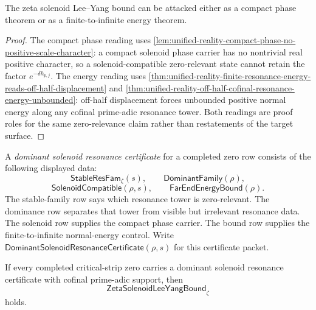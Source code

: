 \begin{corollary}
\label{cor:unified-reality-two-noncircular-readings-same-target}
The zeta solenoid Lee--Yang bound can be attacked either as a compact
phase theorem or as a finite-to-infinite energy theorem.
\end{corollary}

\begin{proof}
The compact phase reading uses
\autoref{lem:unified-reality-compact-phase-no-positive-scale-character}:
a compact solenoid phase carrier has no nontrivial real positive
character, so a solenoid-compatible zero-relevant state cannot retain the
factor $e^{-\delta h_{p,j}}$.  The energy reading uses
\autoref{thm:unified-reality-finite-resonance-energy-reads-off-half-displacement}
and
\autoref{thm:unified-reality-off-half-cofinal-resonance-energy-unbounded}:
off-half displacement forces unbounded positive normal energy along any
cofinal prime-adic resonance tower.  Both readings are proof roles for
the same zero-relevance claim rather than restatements of the target
surface.
\end{proof}

\begin{definition}
\label{def:unified-reality-dominant-solenoid-resonance-certificate}
A \emph{dominant solenoid resonance certificate} for a completed zero
row consists of the following displayed data:
$$
\mathsf{StableResFam}_{\zeta}(s),
\qquad
\mathsf{DominantFamily}(\rho),
$$
$$
\mathsf{SolenoidCompatible}(\rho,s),
\qquad
\mathsf{FarEndEnergyBound}(\rho).
$$
The stable-family row says which resonance tower is zero-relevant.  The
dominance row separates that tower from visible but irrelevant resonance
data.  The solenoid row supplies the compact phase carrier.  The bound
row supplies the finite-to-infinite normal-energy control.
Write $\mathsf{DominantSolenoidResonanceCertificate}(\rho,s)$ for this
certificate packet.
\end{definition}

\begin{theorem}
\label{thm:unified-reality-dominant-solenoid-certificates-supply-combined-bound}
If every completed critical-strip zero carries a dominant solenoid
resonance certificate with cofinal prime-adic support, then
$$
\mathsf{ZetaSolenoidLeeYangBound}_{\zeta}
$$
holds.
\end{theorem}

